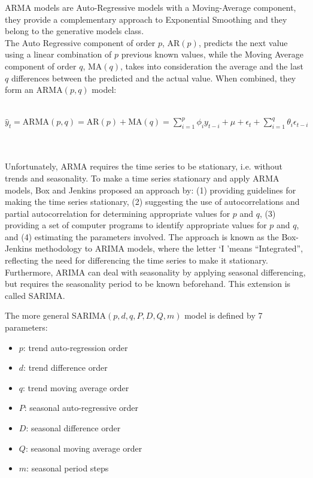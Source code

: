 \documentclass[a4paper]{article} %
\begin{document}
	ARMA models are Auto-Regressive models with a Moving-Average component, they provide a complementary approach to Exponential Smoothing and they belong to the generative models class. \\
	The Auto Regressive component of order $p$, $\text{AR}(p)$, predicts the next value using a linear combination of $p$ previous known values, while the Moving Average component of order $q$, $\text{MA}(q)$, takes into consideration the average and the last $q$ differences between the predicted and the actual value.  When combined, they form an ARMA$(p, q)$ model:\\\\
	\centerline{$\hat{y}_{t} = \text{ARMA}(p, q) = \text{AR}(p) + \text{MA}(q)  = \sum_{i=1}^{p}\phi_i y_{t-i} + \mu + \epsilon_t + \sum_{i=1}^{q}\theta_i \epsilon_{t-i} $}\\\\
	Unfortunately, ARMA requires the time series to be stationary, i.e. without trends and seasonality. To make a time series stationary and apply ARMA models, Box and Jenkins \cite{BoxJenkins} proposed an approach by: (1) providing guidelines for making the time series stationary, (2)  suggesting the use of autocorrelations and partial autocorrelation for determining appropriate values for $p$ and $q$, (3) providing a set of computer programs to identify appropriate values for $p$ and $q$, and (4) estimating the parameters involved. The approach is known as the Box-Jenkins methodology to ARIMA models, where the letter \lq I \rq means ``Integrated'', reflecting the need for differencing the time series to make it stationary. Furthermore, ARIMA can deal with seasonality by applying seasonal differencing, but requires the seasonality period to be known beforehand. This extension is called SARIMA.
	
	The more general SARIMA$(p, d, q, P, D, Q, m)$ model is defined by 7 parameters:
	\begin{itemize}
		\item $p$: trend auto-regression order
		\item $d$: trend difference order
		\item $q$: trend moving average order
		\item $P$: seasonal auto-regressive order
		\item $D$: seasonal difference order
		\item $Q$: seasonal moving average order
		\item $m$: seasonal period steps
	\end{itemize}
\end{document}
